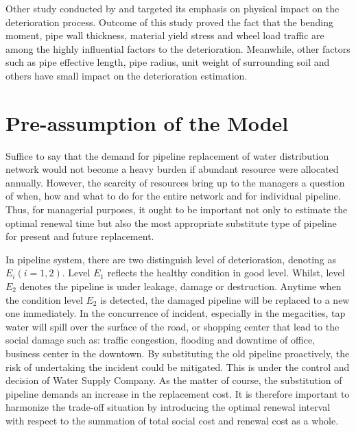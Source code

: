 \documentclass[a4paper,oneside,onecolumn,preprint,10pt,authoryear]{elsarticle}
\begin{document}
Other study conducted by \citet{ahammed95} and \citet{ahammed97} targeted its emphasis on physical impact on the deterioration process. Outcome of this study proved the fact that the bending moment, pipe wall thickness, material yield stress and wheel load traffic are among the highly influential factors to the deterioration. Meanwhile, other factors such as pipe effective length, pipe radius, unit weight of surrounding soil and others have small impact on the deterioration estimation.
\section{Pre-assumption of the Model}
\label{53}
Suffice to say that the demand for pipeline replacement of water distribution network would not become a heavy burden if abundant resource were allocated annually. However, the scarcity of resources bring up to the managers a question of when, how and what to do for the entire network and for individual pipeline. Thus, for managerial purposes, it ought to be important not only to estimate the optimal renewal time but also the most appropriate substitute type of pipeline for present and future replacement. 

In pipeline system, there are two distinguish level of deterioration, denoting as $E_i (i=1,2)$. Level $E_1$ reflects the healthy condition in good level. Whilst, level $E_2$ denotes the pipeline is under leakage, damage or destruction. Anytime when the condition level $E_2$ is detected, the damaged pipeline will be replaced to a new one immediately. In the concurrence of incident, especially in the megacities, tap water will spill over the surface of the road, or shopping center that lead to the social damage such as: traffic congestion, flooding and downtime of office, business center in the downtown. By substituting the old pipeline proactively, the risk of undertaking the incident could be mitigated. This is under the control and decision of Water Supply Company. As the matter of course, the substitution of pipeline demands an increase in the replacement cost. It is therefore important to harmonize the trade-off situation by introducing the optimal renewal interval with respect to the summation of total social cost and renewal cost as a whole.
\end{document}
